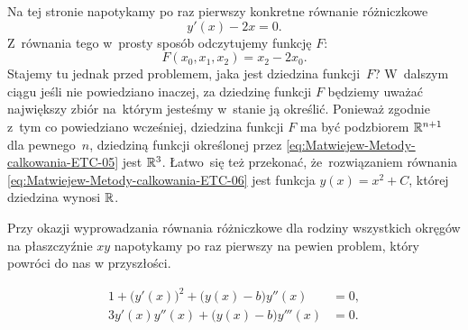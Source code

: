 \documentclass[a4paper,11pt]{article}
\begin{document}
\noindent
{} Na tej stronie napotykamy po raz pierwszy konkretne równanie
różniczkowe
\begin{equation}
  \label{eq:Matwiejew-Metody-calkowania-ETC-06}
  y'( x ) - 2 x = 0.
\end{equation}
Z~równania tego w~prosty sposób odczytujemy funkcję $F$:
\begin{equation}
  \label{eq:Matwiejew-Metody-calkowania-ETC-07}
  F( x_{ 0 }, x_{ 1 }, x_{ 2 } ) = x_{ 2 } - 2 x_{ 0 }.
\end{equation}
Stajemy tu jednak przed problemem, jaka jest dziedzina funkcji~$F$?
W~dalszym ciągu jeśli nie powiedziano inaczej, za dziedzinę funkcji $F$
będziemy uważać największy zbiór na~którym jesteśmy w~stanie ją określić.
Ponieważ zgodnie z~tym co powiedziano wcześniej, dziedzina funkcji $F$ ma
być podzbiorem $\mathbb{R}^{ n + 1 }$ dla pewnego~$n$, dziedziną funkcji określonej
przez \eqref{eq:Matwiejew-Metody-calkowania-ETC-05} jest $\mathbb{R}^{ 3 }$.
Łatwo~się też przekonać, że~rozwiązaniem równania
\eqref{eq:Matwiejew-Metody-calkowania-ETC-06} jest funkcja
$y( x ) = x^{ 2 } + C$, której dziedzina wynosi $\mathbb{R}$.

\vspace{\VerSpaceFour}





\noindent
{} Przy okazji wyprowadzania równania różniczkowe dla rodziny
wszystkich okręgów na płaszczyźnie $x y$ napotykamy po raz pierwszy na
pewien problem, który powróci do nas w przyszłości.

\vspace{\negVerSpaceThree}


\begin{subequations}

  \begin{align}
    \label{eq:Matwiejew-Metody-calkowania-ETC-08-A}
    1 + \big( y'( x ) \big)^{ 2 } + \big( y( x ) - b \big) y''( x )
    &= 0, \\
    \label{eq:Matwiejew-Metody-calkowania-ETC-08-B}
    3 y'( x ) y''( x ) + \big( y( x ) - b \big) y'''( x )
    &= 0.
  \end{align}

\end{subequations}
\end{document}
